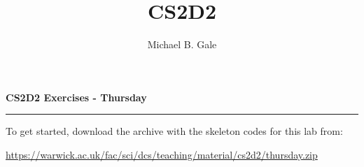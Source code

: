 \documentclass[]{uow-exercises}
\author{Michael B. Gale}
\title{CS2D2}
\begin{document}
\pagestyle{fancy}
\thispagestyle{fancy}

\begin{center}
    \textbf{\LARGE CS2D2 Exercises - Thursday}
\end{center} \hrule \vspace{0.5cm}

To get started, download the archive with the skeleton codes for this lab from:
\begin{center}\footnotesize
    \url{https://warwick.ac.uk/fac/sci/dcs/teaching/material/cs2d2/thursday.zip}
\end{center}



	
\end{document}
